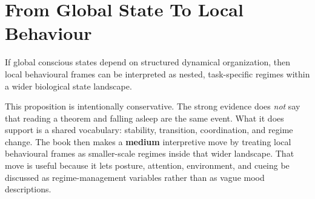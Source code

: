 \section{From Global State To Local Behaviour}

\begin{proposition}
If global conscious states depend on structured dynamical organization, then
local behavioural frames can be interpreted as nested, task-specific regimes
within a wider biological state landscape.
\end{proposition}

\begin{discussion}
This proposition is intentionally conservative. The strong evidence does
\emph{not} say that reading a theorem and falling asleep are the same event.
What it does support is a shared vocabulary: stability, transition,
coordination, and regime change. The book then makes a \textbf{medium}
interpretive move by treating local behavioural frames as smaller-scale regimes
inside that wider landscape. That move is useful because it lets posture,
attention, environment, and cueing be discussed as regime-management variables
rather than as vague mood descriptions.
\end{discussion}

